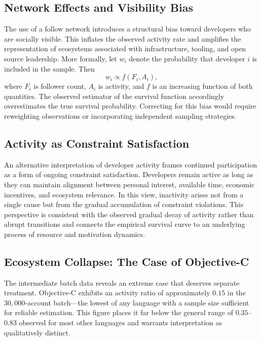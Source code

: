 \documentclass[12pt,a4paper]{article}
\begin{document}
\subsection{Network Effects and Visibility Bias}

The use of a follow network introduces a structural bias toward developers who are socially visible. This inflates the observed activity rate and amplifies the representation of ecosystems associated with infrastructure, tooling, and open source leadership. More formally, let $w_i$ denote the probability that developer $i$ is included in the sample. Then
\[
w_i \propto f(F_i, A_i),
\]
where $F_i$ is follower count, $A_i$ is activity, and $f$ is an increasing function of both quantities. The observed estimator of the survival function accordingly overestimates the true survival probability. Correcting for this bias would require reweighting observations or incorporating independent sampling strategies.

\subsection{Activity as Constraint Satisfaction}

An alternative interpretation of developer activity frames continued participation as a form of ongoing constraint satisfaction. Developers remain active as long as they can maintain alignment between personal interest, available time, economic incentives, and ecosystem relevance. In this view, inactivity arises not from a single cause but from the gradual accumulation of constraint violations. This perspective is consistent with the observed gradual decay of activity rather than abrupt transitions and connects the empirical survival curve to an underlying process of resource and motivation dynamics.

\subsection{Ecosystem Collapse: The Case of Objective-C}

The intermediate batch data reveals an extreme case that deserves separate treatment. Objective-C exhibits an activity ratio of approximately $0.15$ in the $30{,}000$-account batch---the lowest of any language with a sample size sufficient for reliable estimation. This figure places it far below the general range of $0.35$--$0.83$ observed for most other languages and warrants interpretation as qualitatively distinct.
\end{document}
